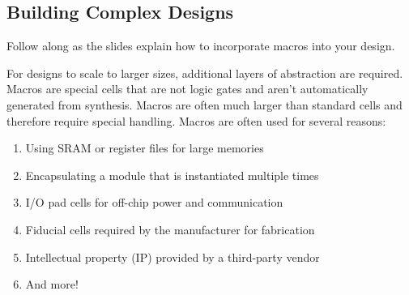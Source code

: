 \documentclass[a4paper,12pt,twoside]{article}
\begin{document}
\subsection{Building Complex Designs}\label{SComplex}
Follow along as the slides explain how to incorporate macros into your design.

For designs to scale to larger sizes, additional layers of abstraction are required. Macros are special cells that are not logic gates and aren't automatically generated from synthesis. Macros are often much larger than standard cells and therefore require special handling. Macros are often used for several reasons:
\begin{enumerate}
    \item Using SRAM or register files for large memories
    \item Encapsulating a module that is instantiated multiple times
    \item I/O pad cells for off-chip power and communication
    \item Fiducial cells required by the manufacturer for fabrication
    \item Intellectual property (IP) provided by a third-party vendor
    \item And more!
\end{enumerate}
\end{document}
